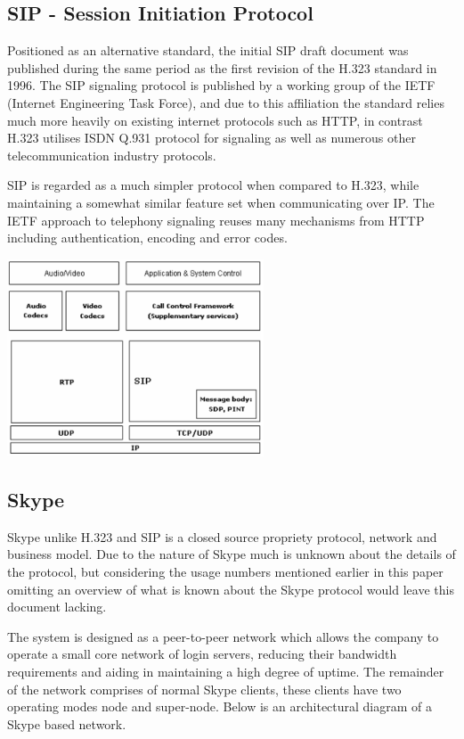 \subsection{SIP - Session Initiation Protocol}
Positioned as an alternative standard, the initial SIP draft document was published during the same period as the first revision of the H.323 standard in 1996. The SIP signaling protocol is published by a working group of the IETF (Internet Engineering Task Force), and due to this affiliation the standard relies much more heavily on existing internet protocols such as HTTP, in contrast H.323 utilises ISDN Q.931 protocol for signaling as well as numerous other telecommunication industry protocols.

SIP is regarded as a much simpler protocol when compared to H.323\cite{paper:miroslavvozna}, while maintaining a somewhat similar feature set\cite{paper:SchulzrinnRosenber} when communicating over IP.  The IETF approach to telephony signaling reuses many mechanisms from HTTP including authentication, encoding and error codes.

\begin{center}
	\includegraphics[width=3in]{images/sip_protocol_suite.png}
\end{center}

\subsection{Skype}
Skype unlike H.323 and SIP is a closed source propriety protocol, network and business model. Due to the nature of Skype much is unknown about the details of the protocol, but considering the usage numbers mentioned earlier in this paper omitting an overview of what is known about the Skype protocol would leave this document lacking.

The system is designed as a peer-to-peer network which allows the company to operate a small core network of login servers, reducing their bandwidth requirements and aiding in maintaining a high degree of uptime. The remainder of the network comprises of normal Skype clients, these clients have two operating modes node and super-node. Below is an architectural diagram of a Skype based network.

